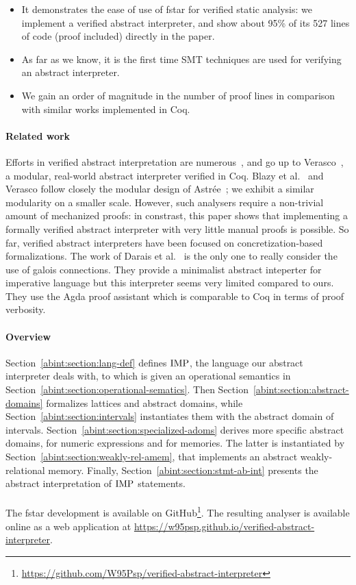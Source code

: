 \begin{itemize}
\item It demonstrates the ease of use of \gls{fstar} for verified
  static analysis: we implement a verified abstract interpreter, and
  show about 95\% of its 527 lines of code (proof included) directly
  in the paper.
\item
  As far as we know, it is the first time SMT techniques are used for
  verifying an abstract interpreter.
\item
  We gain an order of magnitude in the number of proof lines in
  comparison with similar works implemented in Coq.

\end{itemize}



\paragraph{Related work} Efforts in verified abstract interpretation are
numerous~\cite{Pich:these,ITP10:Cachera:Pichardie,SAS13:Blazy:al,Nipkow-ITP12},
and go up to Verasco~\cite{POPL15:Jourdan:al}, a modular, real-world
abstract interpreter verified in Coq.
%
Blazy et al.~\cite{SAS13:Blazy:al} and Verasco follow closely the
modular design of Astrée~\cite{astree}; we exhibit a similar modularity
on a smaller scale.
%
However, such analysers require a non-trivial amount of mechanized
proofs: in constrast, this paper shows that implementing a formally
verified abstract interpreter with very little manual proofs is
possible.
%
So far, verified abstract interpreters have been focused on
concretization-based formalizations.
%
The work of Darais et al.~\cite{darais-oopsla15} is the only one to
really consider the use of galois connections.
%
They provide a minimalist abstract inteperter for imperative language
but this interpreter seems very limited compared to ours.
%
They use the Agda proof assistant which is comparable to Coq in terms
of proof verbosity.

\paragraph{Overview} Section~\ref{abint:section:lang-def} defines $\textrm{IMP}{}$, the language our
abstract interpreter deals with, to which is given an operational
semantics in Section~\ref{abint:section:operational-sematics}.
%
Then Section~\ref{abint:section:abstract-domains} formalizes lattices and abstract
domains, while Section~\ref{abint:section:intervals} instantiates them with the
abstract domain of intervals.
%
Section~\ref{abint:section:specialized-adoms} derives more specific abstract domains,
for numeric expressions and for memories.
%
The latter is instantiated by Section~\ref{abint:section:weakly-rel-amem}, that implements an
abstract weakly-relational memory.
%
Finally, Section~\ref{abint:section:stmt-ab-int} presents the abstract interpretation
of $\textrm{IMP}{}$ statements.

\paragraph{}
The \gls{fstar} development is available on
GitHub\footnote{\url{https://github.com/W95Psp/verified-abstract-interpreter}}.
%
The resulting analyser is available online as a web application at
\url{https://w95psp.github.io/verified-abstract-interpreter}.

